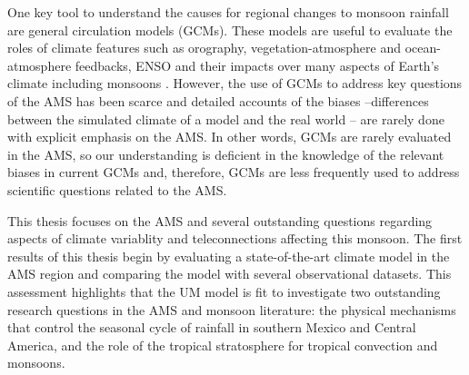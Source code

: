 


One key tool to understand the causes for regional changes to monsoon rainfall are general circulation models (GCMs). These models are useful to evaluate the roles of climate features such as orography, vegetation-atmosphere and ocean-atmosphere feedbacks, ENSO and their impacts over many aspects of Earth's climate including monsoons \citep{zhou2016}. However, the use of GCMs to address key questions of the AMS has been scarce and detailed accounts of the biases --differences between the simulated climate of a model and the real world -- are rarely done with explicit emphasis on the AMS. 
In other words, GCMs are rarely evaluated in the AMS, so our understanding is deficient  in the knowledge of the relevant biases in current GCMs and, therefore, GCMs are less frequently used to address scientific questions related to the AMS. 


 This thesis focuses on the AMS and several outstanding questions regarding aspects of climate variablity and teleconnections affecting this monsoon.
 The first results of this thesis begin  by evaluating a state-of-the-art climate model in the AMS region and comparing the model with several observational datasets. %
 This assessment highlights that the UM model is fit to investigate two outstanding research questions in the AMS and monsoon literature: the physical mechanisms that control the seasonal cycle of rainfall in southern Mexico and Central America, and the role of the tropical stratosphere for tropical convection and monsoons. 
 
